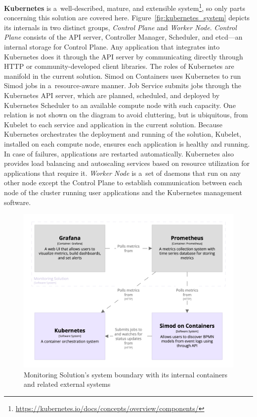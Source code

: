 \documentclass[12pt]{article}
\begin{document}
\textbf{Kubernetes} is a~well-described, mature, and extensible system\footnote{\href{https://kubernetes.io/docs/concepts/overview/components/}{https://kubernetes.io/docs/concepts/overview/components/}}, so only parts concerning this solution are covered here. Figure~\ref{fig:kubernetes_system} depicts its internals in two distinct groups, \emph{Control Plane} and \emph{Worker Node}. \emph{Control Plane} consists of the API server, Controller Manager, Scheduler, and etcd---an internal storage for Control Plane. Any application that integrates into Kubernetes does it through the API server by communicating directly through HTTP or community-developed client libraries. The roles of Kubernetes are manifold in the current solution. Simod on Containers uses Kubernetes to run Simod jobs in a~resource-aware manner. Job Service submits jobs through the Kubernetes API server, which are planned, scheduled, and deployed by Kubernetes Scheduler to an available compute node with such capacity. One relation is not shown on the diagram to avoid cluttering, but is ubiquitous, from Kubelet to each service and application in the current solution. Because Kubernetes orchestrates the deployment and running of the solution, Kubelet, installed on each compute node, ensures each application is healthy and running. In case of failures, applications are restarted automatically. Kubernetes also provides load balancing and autoscaling services based on resource utilization for applications that require it. \emph{Worker Node} is a~set of daemons that run on any other node except the Control Plane to establish communication between each node of the cluster running user applications and the Kubernetes management software.

\begin{figure}[t]
    \centering
    \includegraphics[width=\textwidth]{figures/structurizr-1-MonitoringContainer.png}
    \caption{Monitoring Solution's system boundary with its internal containers and related external systems}
    \label{fig:monitoring_solution}
\end{figure}
\end{document}

